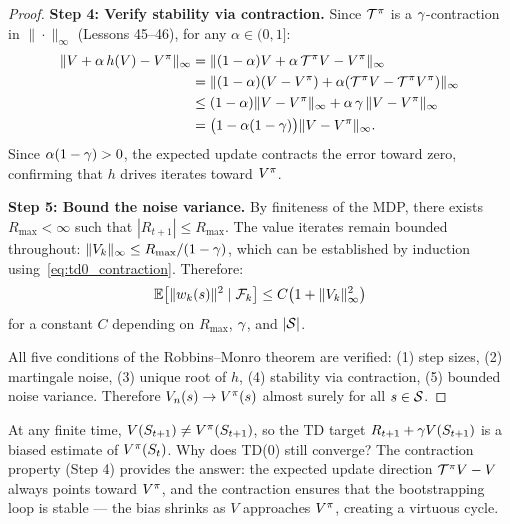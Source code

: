 \documentclass[11pt,a4paper]{article}
\begin{document}
\begin{proof}
\textbf{Step 4: Verify stability via contraction.}
Since $\mathcal{T}^\pi$ is a $\gamma$-contraction in
$\|\cdot\|_\infty$ (Lessons 45--46), for any $\alpha \in (0, 1]$:
\begin{align}
  \|V + \alpha\, h(V) - V^{\pi}\|_\infty
  &= \|(1 - \alpha) V + \alpha\, \mathcal{T}^\pi V - V^{\pi}\|_\infty
     \nonumber\\
  &= \|(1 - \alpha)(V - V^{\pi})
     + \alpha(\mathcal{T}^\pi V - \mathcal{T}^\pi V^{\pi})\|_\infty
     \nonumber\\
  &\leq (1 - \alpha)\|V - V^{\pi}\|_\infty
     + \alpha\,\gamma\,\|V - V^{\pi}\|_\infty \nonumber\\
  &= \bigl(1 - \alpha(1 - \gamma)\bigr)\|V - V^{\pi}\|_\infty.
  \label{eq:td0_contraction}
\end{align}
Since $\alpha(1 - \gamma) > 0$, the expected update contracts the
error toward zero, confirming that $h$ drives iterates toward $V^{\pi}$.

\textbf{Step 5: Bound the noise variance.}
By finiteness of the MDP, there exists $R_{\max} < \infty$ such that
$|R_{t+1}| \leq R_{\max}$. The value iterates remain bounded
throughout: $\|V_k\|_\infty \leq R_{\max}/(1 - \gamma)$, which can
be established by induction using~\eqref{eq:td0_contraction}. Therefore:
\begin{equation}
  \mathbb{E}\bigl[\|w_k(s)\|^2 \mid \mathcal{F}_k\bigr]
  \leq C\bigl(1 + \|V_k\|_\infty^2\bigr)
  \label{eq:td0_noise_bound}
\end{equation}
for a constant $C$ depending on $R_{\max}$, $\gamma$, and
$|\mathcal{S}|$.

\medskip
All five conditions of the Robbins--Monro theorem are verified: (1)
step sizes, (2) martingale noise, (3) unique root of $h$, (4) stability
via contraction, (5) bounded noise variance. Therefore
$V_n(s) \to V^{\pi}(s)$ almost surely for all $s \in \mathcal{S}$.
\end{proof}

\begin{remark}
\label{rem:bootstrap_convergence}
At any finite time, $V(S_{t+1}) \neq V^{\pi}(S_{t+1})$, so the TD
target $R_{t+1} + \gamma V(S_{t+1})$ is a biased estimate of
$V^{\pi}(S_t)$. Why does TD(0) still converge? The contraction property
(Step 4) provides the answer: the expected update direction
$\mathcal{T}^\pi V - V$ always points toward $V^{\pi}$, and the
contraction ensures that the bootstrapping loop is stable --- the
bias shrinks as $V$ approaches $V^{\pi}$, creating a virtuous cycle.
\end{remark}
\end{document}
